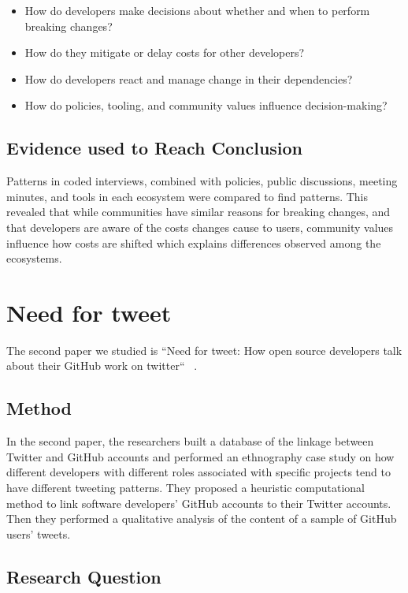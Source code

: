 \documentclass[12pt]{IEEEtran}
\begin{document}
\begin{itemize}
    \item How do developers make decisions about whether and when to perform breaking changes?
    \item How do they mitigate or delay costs for other developers?
    \item How do developers react and manage change in their dependencies?
    \item How do policies, tooling, and community values influence decision-making?
\end{itemize}

\subsection{Evidence used to Reach Conclusion}

Patterns in coded interviews, combined with policies, public discussions, meeting minutes, and tools in each ecosystem were compared to find patterns.
This revealed that while communities have similar reasons for breaking changes, and that developers are aware of the costs changes cause to users, community values influence how costs are shifted which explains differences observed among the ecosystems.

\section{Need for tweet}


The second paper we studied is ``Need for tweet: How open source developers talk about their GitHub work on twitter``~\cite{fang2020need} .


\subsection{Method}
In the second paper, the researchers built a database of the linkage between Twitter and GitHub accounts and performed an ethnography case study on how different developers with different roles associated with specific projects tend to have different tweeting patterns.
They proposed a heuristic computational method to link software developers' GitHub accounts to their Twitter accounts.
Then they performed a qualitative analysis of the content of a sample of GitHub users' tweets.
\subsection{Research Question}
\end{document}
